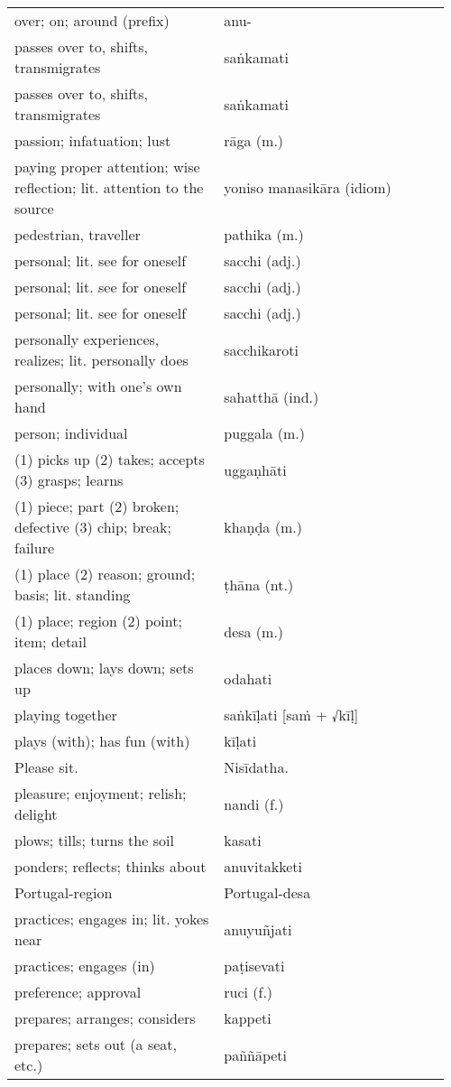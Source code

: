 \documentclass[a5paper]{memoir}
\begin{document}
\begin{longtable}{L{0.48\linewidth} L{0.48\linewidth} H}
over; on; around (prefix) & anu- & \\
passes over to, shifts, transmigrates & saṅkamati & \\
passes over to, shifts, transmigrates & saṅkamati & \\
passion; infatuation; lust & rāga (m.) & \\
paying proper attention; wise reflection; lit. attention to the source & yoniso manasikāra (idiom) & \\
pedestrian, traveller & pathika (m.) & \\
personal; lit. see for oneself & sacchi (adj.) & \\
personal; lit. see for oneself & sacchi (adj.) & \\
personal; lit. see for oneself & sacchi (adj.) & \\
personally experiences, realizes; lit. personally does & sacchikaroti & \\
personally; with one’s own hand & sahatthā (ind.) & \\
person; individual & puggala (m.) & \\
(1) picks up (2) takes; accepts (3) grasps; learns & uggaṇhāti & \\
(1) piece; part (2) broken; defective (3) chip; break; failure & khaṇḍa (m.) & \\
(1) place (2) reason; ground; basis;  lit. standing & ṭhāna (nt.) & \\
(1) place; region (2) point; item; detail & desa (m.) & \\
places down; lays down; sets up & odahati & \\
playing together & saṅkīḷati [saṁ + √kīḷ] & \\
plays (with); has fun (with) & kīḷati & \\
Please sit. & Nisīdatha. & \\
pleasure; enjoyment; relish; delight & nandi (f.) & \\
plows; tills; turns the soil & kasati & \\
ponders; reflects; thinks about & anuvitakketi & \\
Portugal-region & Portugal-desa & \\
practices; engages in; lit. yokes near & anuyuñjati & \\
practices; engages (in) & paṭisevati & \\
preference; approval & ruci (f.) & \\
prepares; arranges; considers & kappeti & \\
prepares; sets out (a seat, etc.) & paññāpeti & \\

\end{longtable}
\end{document}
